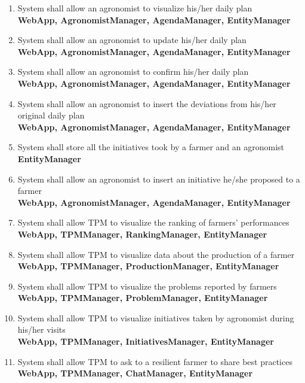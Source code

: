 \begin{enumerate} [label=\textbf{R.\arabic*}]
        \textbf{EntityManager}
    \item System shall allow an agronomist to visualize his/her daily plan\\
        \textbf{WebApp, AgronomistManager, AgendaManager, EntityManager}
    \item System shall allow an agronomist to update his/her daily plan\\
        \textbf{WebApp, AgronomistManager, AgendaManager, EntityManager}
    \item System shall allow an agronomist to confirm his/her daily plan\\
        \textbf{WebApp, AgronomistManager, AgendaManager, EntityManager}
    \item System shall allow an agronomist to insert the deviations from his/her original daily plan\\
        \textbf{WebApp, AgronomistManager, AgendaManager, EntityManager}
    \item System shall store all the initiatives took by a farmer and an agronomist\\
        \textbf{EntityManager}
    \item System shall allow an agronomist to insert an initiative he/she proposed to a farmer\\
        \textbf{WebApp, AgronomistManager, AgendaManager, EntityManager}
    \item System shall allow TPM to visualize the ranking of farmers’ performances\\
        \textbf{WebApp, TPMManager, RankingManager, EntityManager}
    \item System shall allow TPM to visualize data about the production of a farmer\\
        \textbf{WebApp, TPMManager, ProductionManager, EntityManager}
    \item System shall allow TPM to visualize the problems reported by farmers\\
        \textbf{WebApp, TPMManager, ProblemManager, EntityManager}
    \item System shall allow TPM to visualize initiatives taken by agronomist during his/her visits\\
        \textbf{WebApp, TPMManager, InitiativesManager, EntityManager}
    \item System shall allow TPM to ask to a resilient farmer to share best practices\\
        \textbf{WebApp, TPMManager, ChatManager, EntityManager}

\end{enumerate}
